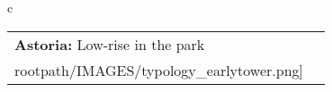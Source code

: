 \begin{table}[H]
        \begin{tabular}{c}
        \begin{tabular}{m{1.5in} m{2in}}
\textbf{Astoria:} {Low-rise in the park} & \texttt{[image: \\rootpath/IMAGES/typology\_earlytower.png]}
\end{tabular}\end{tabular}
        \end{table}